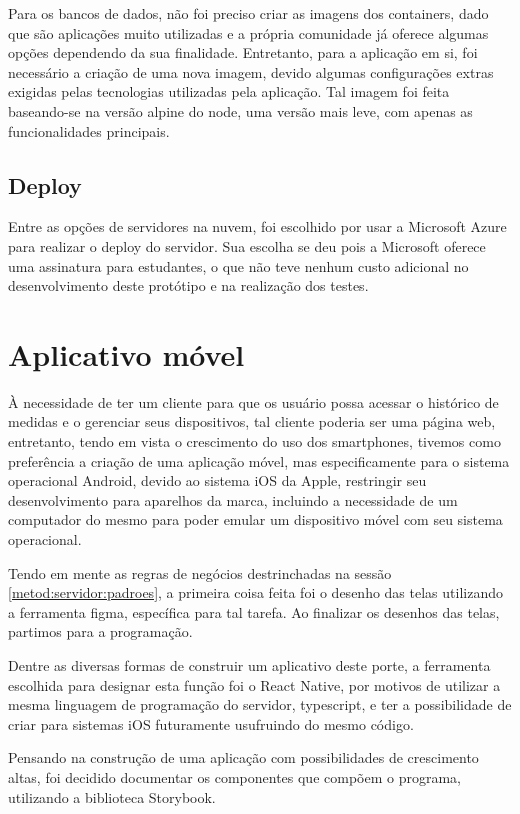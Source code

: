 Para os bancos de dados, não foi preciso criar as imagens dos containers, dado que são aplicações muito utilizadas e a própria comunidade já oferece algumas opções dependendo da sua finalidade. Entretanto, para a aplicação em si, foi necessário a criação de uma nova imagem, devido algumas configurações extras exigidas pelas tecnologias utilizadas pela aplicação. Tal imagem foi feita baseando-se na versão alpine do node, uma versão mais leve, com apenas as funcionalidades principais.

\subsection{Deploy}
\label{metod:servidor:deploy}
Entre as opções de servidores na nuvem, foi escolhido por usar a Microsoft Azure para realizar o deploy do servidor. Sua escolha se deu pois a Microsoft oferece uma assinatura para estudantes, o que não teve nenhum custo adicional no desenvolvimento deste protótipo e na realização dos testes.

\section{Aplicativo móvel}
\label{metod:app}
À necessidade de ter um cliente para que os usuário  possa acessar o histórico de medidas e o gerenciar seus dispositivos, tal cliente poderia ser uma página web, entretanto, tendo em vista o crescimento do uso dos smartphones, tivemos como preferência a criação de uma aplicação móvel, mas especificamente para o sistema operacional Android, devido ao sistema iOS da Apple, restringir seu desenvolvimento para aparelhos da marca, incluindo a necessidade de um computador do mesmo para poder emular um dispositivo móvel com seu sistema operacional.

Tendo em mente as regras de negócios destrinchadas na sessão \ref{metod:servidor:padroes}, a primeira coisa feita foi o desenho das telas utilizando a ferramenta figma, específica para tal tarefa. Ao finalizar os desenhos das telas, partimos para a programação.

Dentre as diversas formas de construir um aplicativo deste porte, a ferramenta escolhida para designar esta função foi o React Native, por motivos de utilizar a mesma linguagem de programação do servidor, typescript, e ter a possibilidade de criar para sistemas iOS futuramente usufruindo do mesmo código.

Pensando na construção de uma aplicação com possibilidades de crescimento altas, foi decidido documentar os componentes que compõem o programa, utilizando a biblioteca Storybook.

